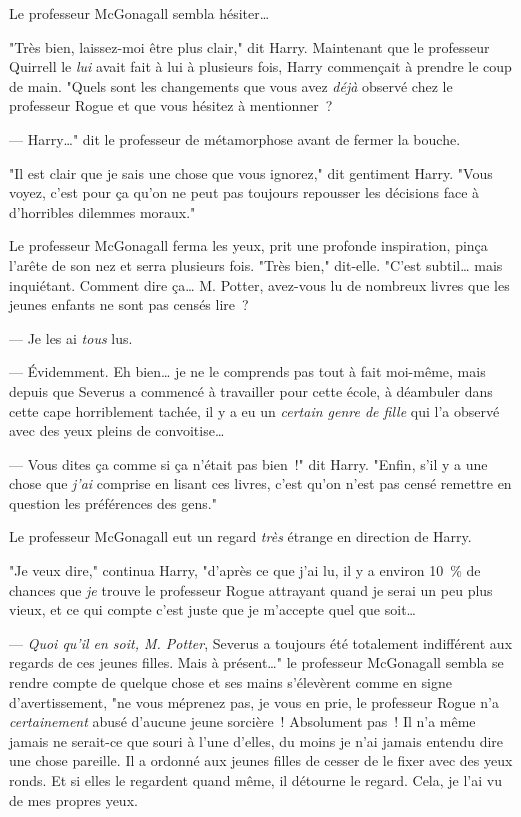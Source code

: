 Le professeur McGonagall sembla hésiter…

"Très bien, laissez-moi être plus clair," dit Harry. Maintenant que le professeur Quirrell le \emph{lui} avait fait à lui à plusieurs fois, Harry commençait à prendre le coup de main. "Quels sont les changements que vous avez \emph{déjà} observé chez le professeur Rogue et que vous hésitez à mentionner~?

--- Harry…" dit le professeur de métamorphose avant de fermer la bouche.

"Il est clair que je sais une chose que vous ignorez," dit gentiment Harry. "Vous voyez, c'est pour ça qu'on ne peut pas toujours repousser les décisions face à d'horribles dilemmes moraux."

Le professeur McGonagall ferma les yeux, prit une profonde inspiration, pinça l'arête de son nez et serra plusieurs fois. "Très bien," dit-elle. "C'est subtil… mais inquiétant. Comment dire ça… M. Potter, avez-vous lu de nombreux livres que les jeunes enfants ne sont pas censés lire~?

--- Je les ai \emph{tous} lus.

--- Évidemment. Eh bien… je ne le comprends pas tout à fait moi-même, mais depuis que Severus a commencé à travailler pour cette école, à déambuler dans cette cape horriblement tachée, il y a eu un \emph{certain genre de fille} qui l'a observé avec des yeux pleins de convoitise…

--- Vous dites ça comme si ça n'était pas bien~!" dit Harry. "Enfin, s'il y a une chose que \emph{j'ai} comprise en lisant ces livres, c'est qu'on n'est pas censé remettre en question les préférences des gens."

Le professeur McGonagall eut un regard \emph{très} étrange en direction de Harry.

"Je veux dire," continua Harry, "d'après ce que j'ai lu, il y a environ 10~\% de chances que \emph{je} trouve le professeur Rogue attrayant quand je serai un peu plus vieux, et ce qui compte c'est juste que je m'accepte quel que soit…

--- \emph{Quoi qu'il en soit, M. Potter}, Severus a toujours été totalement indifférent aux regards de ces jeunes filles. Mais à présent…" le professeur McGonagall sembla se rendre compte de quelque chose et ses mains s'élevèrent comme en signe d'avertissement, "ne vous méprenez pas, je vous en prie, le professeur Rogue n'a \emph{certainement} abusé d'aucune jeune sorcière~! Absolument pas~! Il n'a même jamais ne serait-ce que souri à l'une d'elles, du moins je n'ai jamais entendu dire une chose pareille. Il a ordonné aux jeunes filles de cesser de le fixer avec des yeux ronds. Et si elles le regardent quand même, il détourne le regard. Cela, je l'ai vu de mes propres yeux.

